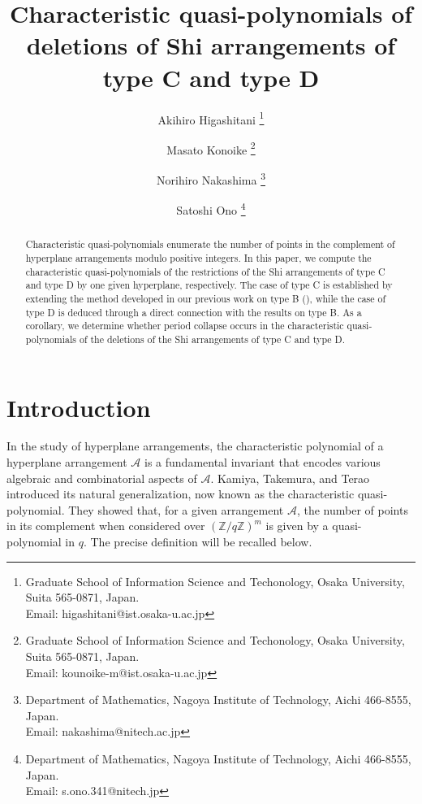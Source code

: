 \documentclass{article}
\title{Characteristic quasi-polynomials of deletions of Shi arrangements of type C and type D}
\author{Akihiro Higashitani \thanks{Graduate School of Information Science and Techonology, Osaka University, Suita 565-0871, Japan. \\
Email: higashitani@ist.osaka-u.ac.jp} \and Masato Konoike \thanks{Graduate School of Information Science and Techonology, Osaka University, Suita 565-0871, Japan. \\ Email: kounoike-m@ist.osaka-u.ac.jp} \and Norihiro Nakashima \thanks{Department of Mathematics, Nagoya Institute of Technology, Aichi 466-8555, Japan. \\ Email: nakashima@nitech.ac.jp} \and Satoshi Ono \thanks{Department of Mathematics, Nagoya Institute of Technology, Aichi 466-8555, Japan. \\ Email: s.ono.341@nitech.jp}}
\date{}
\theoremstyle{plain}
\theoremstyle{definition}
\theoremstyle{remark}
\numberwithin{equation}{section}
\begin{document}
\maketitle

\begin{abstract}
Characteristic quasi-polynomials enumerate the number of points in the complement of hyperplane arrangements modulo positive integers. 
In this paper, we compute the characteristic quasi-polynomials of the restrictions of the Shi arrangements of type C and type D by one given hyperplane, respectively. 
The case of type C is established by extending the method developed in our previous work on type B (\cite{HN2024}), 
while the case of type D is deduced through a direct connection with the results on type B. 
As a corollary, we determine whether period collapse occurs in the characteristic quasi-polynomials of the deletions of the Shi arrangements of type C and type D. 
\end{abstract}

\tableofcontents

\section{Introduction}


In the study of hyperplane arrangements, the characteristic polynomial of a hyperplane arrangement $\mathcal{A}$ is a fundamental invariant that encodes various algebraic and combinatorial aspects of $\mathcal{A}$. 
Kamiya, Takemura, and Terao \cite{KTT08, KTT11} introduced its natural generalization, now known as the characteristic quasi-polynomial. 
They showed that, for a given arrangement $\mathcal{A}$, the number of points in its complement when considered over $(\mathbb{Z}/q\mathbb{Z})^m$ is given by a quasi-polynomial in $q$. The precise definition will be recalled below. 

\end{document}
